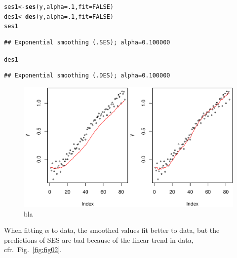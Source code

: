 \documentclass[10pt]{article}\usepackage[]{graphicx}\usepackage[]{color}
\makeatletter
\def\maxwidth{ %
  \ifdim\Gin@nat@width>\linewidth
    \linewidth
  \else
    \Gin@nat@width
  \fi
}
\newcommand{\hlnum}[1]{\textcolor[rgb]{0.686,0.059,0.569}{#1}}%
\newcommand{\hlstd}[1]{\textcolor[rgb]{0.345,0.345,0.345}{#1}}%
\newcommand{\hlkwb}[1]{\textcolor[rgb]{0.69,0.353,0.396}{#1}}%
\newcommand{\hlkwc}[1]{\textcolor[rgb]{0.333,0.667,0.333}{#1}}%
\newcommand{\hlkwd}[1]{\textcolor[rgb]{0.737,0.353,0.396}{\textbf{#1}}}%
\newenvironment{kframe}{%
 \def\at@end@of@kframe{}%
 \ifinner\ifhmode%
  \def\at@end@of@kframe{\end{minipage}}%
  \begin{minipage}{\columnwidth}%
 \fi\fi%
 \def\FrameCommand##1{\hskip\@totalleftmargin \hskip-\fboxsep
 \colorbox{shadecolor}{##1}\hskip-\fboxsep
     \hskip-\linewidth \hskip-\@totalleftmargin \hskip\columnwidth}%
 \MakeFramed {\advance\hsize-\width
   \@totalleftmargin\z@ \linewidth\hsize
   \@setminipage}}%
 {\par\unskip\endMakeFramed%
 \at@end@of@kframe}
\newenvironment{knitrout}{}{} %
\makeatother
\begin{document}
\begin{knitrout}
\color{fgcolor}\begin{kframe}
\begin{alltt}
\hlstd{ses1} \hlkwb{<-} \hlkwd{ses}\hlstd{(y,} \hlkwc{alpha}\hlstd{=}\hlnum{.1}\hlstd{,} \hlkwc{fit}\hlstd{=}\hlnum{FALSE}\hlstd{)}
\hlstd{des1} \hlkwb{<-} \hlkwd{des}\hlstd{(y,} \hlkwc{alpha}\hlstd{=}\hlnum{.1}\hlstd{,} \hlkwc{fit}\hlstd{=}\hlnum{FALSE}\hlstd{)}
\hlstd{ses1}
\end{alltt}
\begin{verbatim}
## Exponential smoothing (.SES); alpha=0.100000
\end{verbatim}
\begin{alltt}
\hlstd{des1}
\end{alltt}
\begin{verbatim}
## Exponential smoothing (.DES); alpha=0.100000
\end{verbatim}
\end{kframe}
\end{knitrout}

\begin{knitrout}
\color{fgcolor}\begin{figure}
\includegraphics[width=\maxwidth]{fig/graphfig01-1} \caption[bla]{bla}\label{fig:fig01}
\end{figure}


\end{knitrout}

When fitting $\alpha$ to data, the smoothed values fit better to data,
but the predictions of SES are bad because of the linear trend in
data, cfr.\ Fig.~\ref{fig:fig02}.
\end{document}
